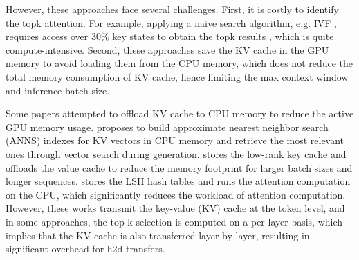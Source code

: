 However, these approaches face several challenges. First, it is costly to identify the topk attention. For example, applying a naive search algorithm, e.g. IVF \citep{douze2024faisslibrary}, requires access over $30\%$ key states to obtain the topk results \citep{liu2024retrievalattention}, which is quite compute-intensive. Second, these approaches save the KV cache in the GPU memory to avoid loading them from the CPU memory, which does not reduce the total memory consumption of KV cache, hence limiting the max context window and inference batch size.

Some papers attempted to offload KV cache to CPU memory to reduce the active GPU memory usage. \cite{liu2024retrievalattention} proposes to build approximate nearest neighbor search (ANNS) indexes for KV vectors in CPU memory and retrieve the most relevant ones through vector search during generation. \cite{sun2024shadowkv} stores the low-rank key cache and offloads the value cache to reduce the memory footprint for larger batch sizes and longer sequences. \cite{chen2024magicpig} stores the LSH hash tables and runs the attention computation on the CPU, which significantly reduces the workload of attention computation. However, these works transmit the key-value (KV) cache at the token level, and in some approaches, the top-k selection is computed on a per-layer basis, which implies that the KV cache is also transferred layer by layer, resulting in significant overhead for h2d transfers.